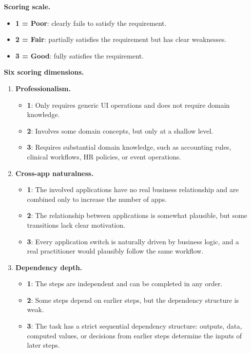 \begin{tcolorbox}[
    title=Text-only Static Check Rubric,
    colback=gray!3,
    colframe=black!45,
    fonttitle=\bfseries,
    breakable
]
\textbf{Scoring scale.}
\begin{itemize}[]
    \item \textbf{1 = Poor}: clearly fails to satisfy the requirement.
    \item \textbf{2 = Fair}: partially satisfies the requirement but has clear weaknesses.
    \item \textbf{3 = Good}: fully satisfies the requirement.
\end{itemize}

\textbf{Six scoring dimensions.}

\begin{enumerate}
    \item \textbf{Professionalism.}
    \begin{itemize}
        \item \textbf{1}: Only requires generic UI operations and does not require domain knowledge.
        \item \textbf{2}: Involves some domain concepts, but only at a shallow level.
        \item \textbf{3}: Requires substantial domain knowledge, such as accounting rules, clinical workflows, HR policies, or event operations.
    \end{itemize}

    \item \textbf{Cross-app naturalness.}
    \begin{itemize}
        \item \textbf{1}: The involved applications have no real business relationship and are combined only to increase the number of apps.
        \item \textbf{2}: The relationship between applications is somewhat plausible, but some transitions lack clear motivation.
        \item \textbf{3}: Every application switch is naturally driven by business logic, and a real practitioner would plausibly follow the same workflow.
    \end{itemize}

    \item \textbf{Dependency depth.}
    \begin{itemize}
        \item \textbf{1}: The steps are independent and can be completed in any order.
        \item \textbf{2}: Some steps depend on earlier steps, but the dependency structure is weak.
        \item \textbf{3}: The task has a strict sequential dependency structure: outputs, data, computed values, or decisions from earlier steps determine the inputs of later steps.
    \end{itemize}


\end{enumerate}
\end{tcolorbox}
